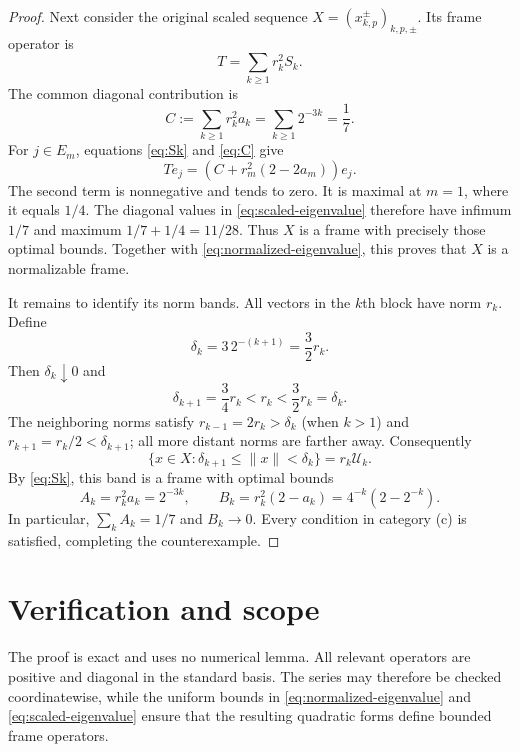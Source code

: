 \documentclass[11pt]{article}
\newcommand{\cU}{\mathcal U}
\begin{document}
\begin{proof}
Next consider the original scaled sequence
$X=(x_{k,p}^{\pm})_{k,p,\pm}$.  Its frame operator is
\[
 T=\sum_{k\ge1}r_k^2S_k.
\]
The common diagonal contribution is
\begin{equation}\label{eq:C}
 C:=\sum_{k\ge1}r_k^2a_k
 =\sum_{k\ge1}2^{-3k}=\frac17.
\end{equation}
For $j\in E_m$, equations \eqref{eq:Sk} and \eqref{eq:C} give
\begin{equation}\label{eq:scaled-eigenvalue}
 Te_j=\left(C+r_m^2(2-2a_m)\right)e_j.
\end{equation}
The second term is nonnegative and tends to zero.  It is maximal at $m=1$,
where it equals $1/4$.  The diagonal values in
\eqref{eq:scaled-eigenvalue} therefore have infimum $1/7$ and maximum
$1/7+1/4=11/28$.  Thus $X$ is a frame with precisely those optimal bounds.
Together with \eqref{eq:normalized-eigenvalue}, this proves that $X$ is a
normalizable frame.

It remains to identify its norm bands.  All vectors in the $k$th block have
norm $r_k$.  Define
\begin{equation}\label{eq:delta}
 \delta_k=3\,2^{-(k+1)}=\frac32r_k.
\end{equation}
Then $\delta_k\downarrow0$ and
\[
 \delta_{k+1}=\frac34r_k<r_k<\frac32r_k=\delta_k.
\]
The neighboring norms satisfy $r_{k-1}=2r_k>\delta_k$ (when $k>1$) and
$r_{k+1}=r_k/2<\delta_{k+1}$; all more distant norms are farther away.
Consequently
\begin{equation}\label{eq:band}
 \{x\in X:\delta_{k+1}\le\|x\|<\delta_k\}=r_k\cU_k.
\end{equation}
By \eqref{eq:Sk}, this band is a frame with optimal bounds
\[
 A_k=r_k^2a_k=2^{-3k},\qquad
 B_k=r_k^2(2-a_k)=4^{-k}(2-2^{-k}).
\]
In particular, $\sum_kA_k=1/7$ and $B_k\to0$.  Every condition in category
(c) is satisfied, completing the counterexample.
\end{proof}

\section{Verification and scope}

The proof is exact and uses no numerical lemma.  All relevant operators are
positive and diagonal in the standard basis.  The series may therefore be
checked coordinatewise, while the uniform bounds in
\eqref{eq:normalized-eigenvalue} and \eqref{eq:scaled-eigenvalue} ensure that
the resulting quadratic forms define bounded frame operators.
\end{document}
